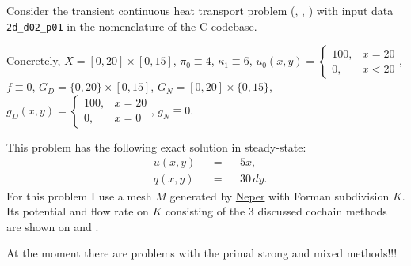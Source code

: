 \begin{example}
  \label{cmc/diffusion/continuous/transient/examples/2d_d02_p01-example}
  Consider the transient continuous heat transport problem
  (,
   ,
   )
  with input data \verb|2d_d02_p01| in the nomenclature of the C codebase.

  Concretely,
    $X = [0, 20] \times [0, 15]$,
    $\pi_0 \equiv 4$,
    $\kappa_1 \equiv 6$,
    $u_0(x, y) = \begin{cases} 100, & x = 20 \\ 0, & x < 20 \end{cases}$,
    $f \equiv 0$,
    $G_D = \{0, 20\} \times [0, 15]$,
    $G_N = [0, 20] \times \{0, 15\}$,
    $g_D(x, y) = \begin{cases} 100, & x = 20 \\ 0, & x = 0 \end{cases}$,
    $g_N \equiv 0$.

  This problem has the following exact solution in steady-state:
  \begin{subequations}
    \begin{alignat}{3}
      & u(x, y) && = && 5 x, \\
      & q(x, y) && = && 30 \, d y.
    \end{alignat}
  \end{subequations}
  For this problem I use a mesh $M$ generated by
  \href{https://neper.info/}{Neper} with Forman subdivision $K$.
  Its potential and flow rate on $K$ consisting of the $3$ discussed cochain
  methods are shown on
  and
  .

  {\color{red} At the moment there are problems with the primal strong and mixed
  methods!!!}
\end{example}
